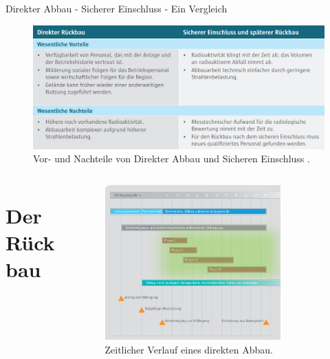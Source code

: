 \begin{frame}{ Direkter Abbau - Sicherer Einschluss - Ein Vergleich}
  \begin{figure}
     \centering
     \includegraphics[width=1\textwidth]{./bilder/vor_nachteile_direkter_einschluss.PNG}
     \caption{ Vor- und Nachteile von Direkter Abbau und Sicheren Einschluss \cite{stilllegung_grs}. }
     \label{ fig: karte_abschaltungen }
   \end{figure}
\end{frame}



\begin{frame}
  \begin{columns}
  
      \begin{column}{0.2\textwidth}
        \section{Der Rückbau}
      \end{column}
  
      \begin{column}{0.78\textwidth}
        \begin{figure}
          \centering
          \includegraphics[width=0.8\textwidth]{./bilder/stillegung_phasen.png}
          \caption{ Zeitlicher Verlauf eines direkten Abbau\cite{stilllegung_grs}. }
          \label{ fig: stillegung }
        \end{figure}
      \end{column}

  \end{columns}
\end{frame}




